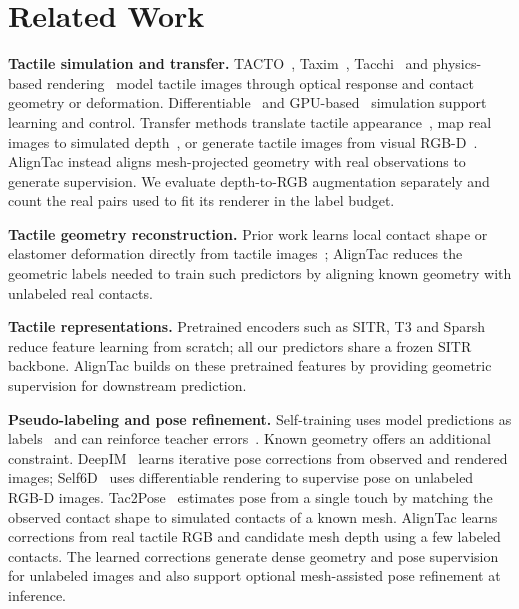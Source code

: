 \section{Related Work}

\noindent\textbf{Tactile simulation and transfer.}
TACTO~\cite{wang2022tacto}, Taxim~\cite{si2022taxim}, Tacchi~\cite{chen2023tacchi} and physics-based rendering~\cite{agarwal2021simulation} model tactile images through optical response and contact geometry or deformation. Differentiable~\cite{xu2022efficient} and GPU-based~\cite{akinola2025tacsl} simulation support learning and control. Transfer methods translate tactile appearance~\cite{chen2022cyclegan}, map real images to simulated depth~\cite{church2022tactile}, or generate tactile images from visual RGB-D~\cite{zhong2025tactgen}. AlignTac instead aligns mesh-projected geometry with real observations to generate supervision. We evaluate depth-to-RGB augmentation separately and count the real pairs used to fit its renderer in the label budget.

\noindent\textbf{Tactile geometry reconstruction.}
Prior work learns local contact shape or elastomer deformation directly from tactile images~\cite{bauza2019tactile,zhu2022volumetric}; AlignTac reduces the geometric labels needed to train such predictors by aligning known geometry with unlabeled real contacts.

\noindent\textbf{Tactile representations.}
Pretrained encoders such as SITR, T3 and Sparsh~\cite{gupta2025sitr,zhao2024transferable,higuera2024sparsh} reduce feature learning from scratch; all our predictors share a frozen SITR backbone. AlignTac builds on these pretrained features by providing geometric supervision for downstream prediction.

\noindent\textbf{Pseudo-labeling and pose refinement.}
Self-training uses model predictions as labels~\cite{lee2013pseudo,xie2020noisy} and can reinforce teacher errors~\cite{arazo2020pseudo}. Known geometry offers an additional constraint. DeepIM~\cite{li2018deepim} learns iterative pose corrections from observed and rendered images; Self6D~\cite{wang2020self6d} uses differentiable rendering to supervise pose on unlabeled RGB-D images. Tac2Pose~\cite{bauza2023tac2pose} estimates pose from a single touch by matching the observed contact shape to simulated contacts of a known mesh. AlignTac learns corrections from real tactile RGB and candidate mesh depth using a few labeled contacts. The learned corrections generate dense geometry and pose supervision for unlabeled images and also support optional mesh-assisted pose refinement at inference.
